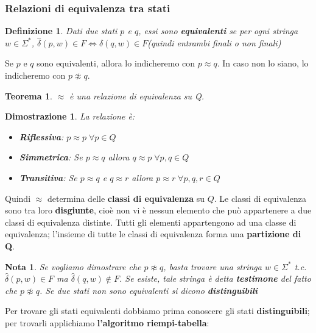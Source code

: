 \documentclass[12pt]{article}
\newtheorem{Definizione}{Definizione}[subsection]
\newtheorem{Teorema}{Teorema}[subsection]
\newtheorem{Dimostrazione}{Dimostrazione}[subsection]
\newtheorem{Nota}{Nota}[subsection]
\begin{document}
\subsubsection{Relazioni di equivalenza tra stati}
\begin{Definizione}
    Dati due stati $p$ e $q$, essi sono \textbf{equivalenti} se per ogni stringa $w \in \Sigma^*$, $\hat{\delta}(p, w) \in F \Leftrightarrow \hat{\delta}(q, w) \in F$(quindi entrambi finali o non finali)
\end{Definizione}
Se $p$ e $q$ sono equivalenti, allora lo indicheremo con $p \approx q$. In caso non lo siano, lo indicheremo con $p \not\approx q$.
\begin{Teorema}
    $\approx$ è una relazione di equivalenza su Q.
\end{Teorema}
\begin{Dimostrazione}
    La relazione è:
    \begin{itemize}
        \item \textbf{Riflessiva}: $p \approx p \; \forall p \in Q$
        \item \textbf{Simmetrica}: Se $p \approx q$ allora $q \approx p \; \forall p,q \in Q$
        \item \textbf{Transitiva}: Se $p \approx q$ e $q \approx r$ allora $p \approx r \; \forall p,q,r\in Q$
    \end{itemize}
\end{Dimostrazione}
Quindi $\approx$ determina delle \textbf{classi di equivalenza} su $Q$. Le classi di equivalenza sono tra loro \textbf{disgiunte}, cioè non vi è nessun elemento che può appartenere a due classi di equivalenza distinte. \newline
Tutti gli elementi appartengono ad una classe di equivalenza; l'insieme di tutte le classi di equivalenza forma una \textbf{partizione di Q}.
\begin{Nota}
    Se vogliamo dimostrare che $p \not\approx q$, basta trovare una stringa $w \in \Sigma^*$ t.c. $\hat{\delta}(p, w) \in F$ ma $\hat{\delta}(q, w) \not\in F$. Se esiste, tale stringa è detta \textbf{testimone} del fatto che $p \not\approx q$. Se due stati non sono equivalenti si dicono \textbf{distinguibili}
\end{Nota}
Per trovare gli stati equivalenti dobbiamo prima conoscere gli stati \textbf{distinguibili}; per trovarli applichiamo \textbf{l'algoritmo riempi-tabella}:
\end{document}
